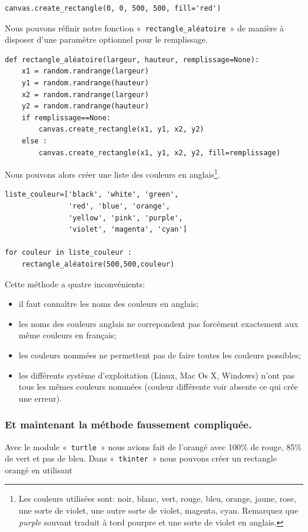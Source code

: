 \begin{Verbatim}[frame=single,rulecolor=\color{gray}, label=exemple]
canvas.create_rectangle(0, 0, 500, 500, fill='red')
\end{Verbatim}

Nous pouvons réfinir notre fonction «~\texttt{rectangle\_aléatoire}~»  de manière à disposer d'une paramètre optionnel pour le remplissage.

\begin{Verbatim}[frame=single,rulecolor=\color{mbleu}, label=à taper]
def rectangle_aléatoire(largeur, hauteur, remplissage=None):
    x1 = random.randrange(largeur)
    y1 = random.randrange(hauteur)
    x2 = random.randrange(largeur)
    y2 = random.randrange(hauteur)
    if remplissage==None:
        canvas.create_rectangle(x1, y1, x2, y2)
    else :	
        canvas.create_rectangle(x1, y1, x2, y2, fill=remplissage)
\end{Verbatim}

Nous pouvons alors créer une liste des couleurs en anglais\footnote{Les couleurs utilisées sont: noir, blanc, vert, rouge, bleu, orange, jaune, rose, une sorte de violet, une autre sorte de violet, magenta, cyan. Remarquez que \emph{purple} souvant traduit à tord pourpre et une sorte de violet en anglais.}. 

\begin{Verbatim}[frame=single,rulecolor=\color{mbleu}, label=à taper]
liste_couleur=['black', 'white', 'green',
               'red', 'blue', 'orange',
               'yellow', 'pink', 'purple',
               'violet', 'magenta', 'cyan']

for couleur in liste_couleur :
	rectangle_aléatoire(500,500,couleur)
\end{Verbatim}

Cette méthode a quatre inconvénients: 
\begin{itemize}
\item il faut connaître les noms des couleurs en anglais;
\item les noms des couleurs anglais ne correpondent pas forcément exactement aux même couleurs en français;
\item les couleurs nommées ne permettent pas de faire toutes les couleurs possibles;
\item les différents système d'exploitation (Linux, Mac Os X, Windows) n'ont pas tous les mêmes couleurs nommées (couleur différente voir absente ce qui crée une erreur).
\end{itemize}
\subsubsection*{Et maintenant la méthode faussement compliquée.}
Avec le module «~\texttt{turtle}~» nous avions fait de l'orangé avec 100\% de rouge, 85\% de vert et pas de bleu. Dans «~\texttt{tkinter}~» nous pouvons créer un rectangle orangé en utilisant

